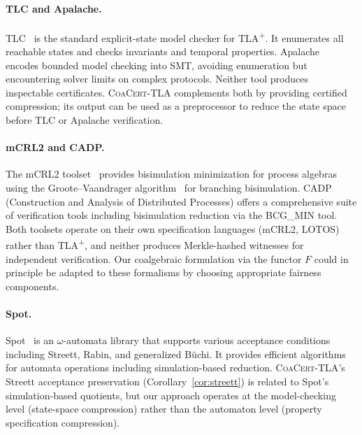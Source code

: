\documentclass[11pt]{article}
\newcommand{\CoaCert}{\textsc{CoaCert-TLA}}
\newcommand{\TLAplus}{TLA\textsuperscript{+}}
\begin{document}
\paragraph{TLC and Apalache.}
TLC~\cite{TLC} is the standard explicit-state model checker for \TLAplus{}.
It enumerates all reachable states and checks invariants and temporal
properties.
Apalache~\cite{Apalache} encodes bounded model checking into SMT,
avoiding enumeration but encountering solver limits on complex protocols.
Neither tool produces inspectable certificates.
\CoaCert{} complements both by providing certified compression; its output
can be used as a preprocessor to reduce the state space before TLC or
Apalache verification.

\paragraph{mCRL2 and CADP.}
The mCRL2 toolset~\cite{mCRL2} provides bisimulation minimization for
process algebras using the Groote--Vaandrager algorithm~\cite{GrooteV90}
for branching bisimulation.
CADP~\cite{CADP} (Construction and Analysis of Distributed Processes)
offers a comprehensive suite of verification tools including bisimulation
reduction via the BCG\_MIN tool.
Both toolsets operate on their own specification languages (mCRL2, LOTOS)
rather than \TLAplus{}, and neither produces Merkle-hashed witnesses
for independent verification.
Our coalgebraic formulation via the functor $F$ could in principle be
adapted to these formalisms by choosing appropriate fairness components.

\paragraph{Spot.}
Spot~\cite{Spot} is an $\omega$-automata library that supports various
acceptance conditions including Streett, Rabin, and generalized B\"uchi.
It provides efficient algorithms for automata operations including
simulation-based reduction.
\CoaCert{}'s Streett acceptance preservation (Corollary~\ref{cor:streett})
is related to Spot's simulation-based quotients, but our approach operates
at the model-checking level (state-space compression) rather than the
automaton level (property specification compression).
\end{document}
